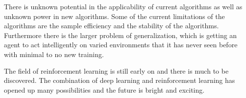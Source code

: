 There is unknown potential in the applicability of current algorithms as well as unknown power in new algorithms. Some of the current limitations of the algorithms are the sample efficiency and the stability of the algorithms. Furthermore there is the larger problem of generalization, which is getting an agent to act intelligently on varied environments that it has never seen before with minimal to no new training.

The field of reinforcement learning is still early on and there is much to be discovered. The combination of deep learning and reinforcement learning has opened up many possibilities and the future is bright and exciting.